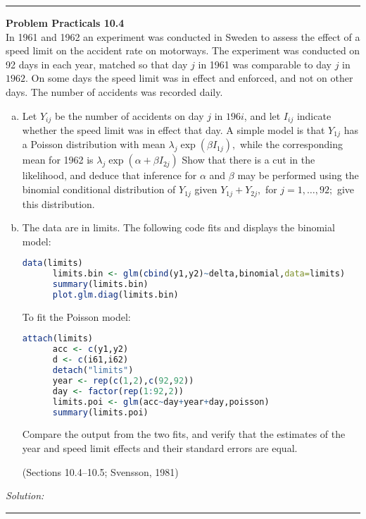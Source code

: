 \documentclass[a4paper, 11pt]{article}
\newenvironment{problem}[2][Problem]
    { \begin{mdframed}[backgroundcolor=gray!20] \textbf{#1 #2} \\}
    {  \end{mdframed}}
\newenvironment{solution}
    {\textit{Solution:}}
    {}
\begin{document}
\noindent\rule{7in}{2.8pt}
\begin{problem}{Practicals 10.4}
  In  1961 and 1962 an experiment was conducted in Sweden to assess the effect of a speed limit on the accident rate on motorways. The experiment was conducted on 92 days in each year, matched so that day $j$ in 1961 was comparable to day $j$ in $1962 .$ On some days the speed limit was in effect and enforced, and not on other days. The number of accidents was recorded daily.
\begin{enumerate}[(a)]
  \item Let $Y_{i j}$ be the number of accidents on day $j$ in $196 i$, and let $I_{i j}$ indicate whether the speed limit was in effect that day. A simple model is that $Y_{1 j}$ has a Poisson distribution with mean $\lambda_{j} \exp \left(\beta I_{1 j}\right),$ while the corresponding mean for 1962 is $\lambda_{j} \exp \left(\alpha+\beta I_{2 j}\right)$
  Show that there is a cut in the likelihood, and deduce that inference for $\alpha$ and $\beta$ may be performed using the binomial conditional distribution of $Y_{1 j}$ given $Y_{1 j}+Y_{2 j},$ for $j=1, \ldots, 92 ;$ give this distribution.
  \item The data are in limits. The following code fits and displays the binomial model:
    \begin{lstlisting}[language=R]
      data(limits)
      limits.bin <- glm(cbind(y1,y2)~delta,binomial,data=limits)
      summary(limits.bin)
      plot.glm.diag(limits.bin)
    \end{lstlisting}

To fit the Poisson model:
    \begin{lstlisting}[language=R]
      attach(limits)
      acc <- c(y1,y2)
      d <- c(i61,i62)
      detach("limits")
      year <- rep(c(1,2),c(92,92))
      day <- factor(rep(1:92,2))
      limits.poi <- glm(acc~day+year+day,poisson)
      summary(limits.poi)
    \end{lstlisting}

Compare the output from the two fits, and verify that the estimates of the year and
speed limit effects and their standard errors are equal.

(Sections 10.4–10.5; Svensson, 1981)
\end{enumerate}
\end{problem}
\begin{solution}

\end{solution}

\noindent\rule{7in}{2.8pt}
\end{document}
